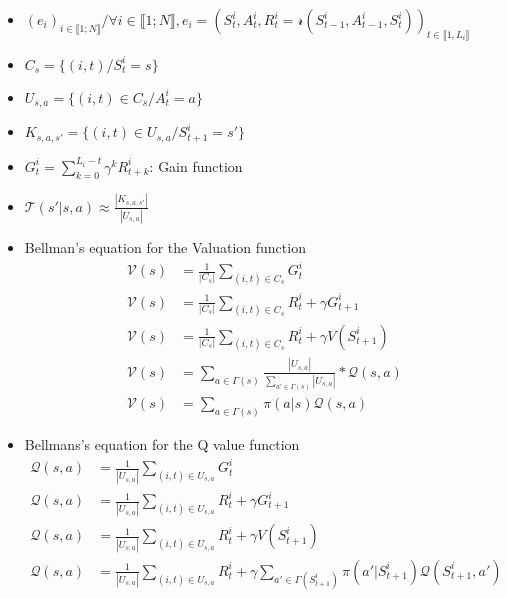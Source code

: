 \documentclass[8pt,a4paper]{extarticle}
\begin{document}
\begin{itemize}

\item
  $(e_i)_{i \in \llbracket 1; N \rrbracket} / \forall i \in \llbracket 1; N \rrbracket, e_i = (S_t^i, A^i_t, R^i_t = \mathcal r(S_{t-1}^i, A_{t-1}^i, S_t^i))_{t \in \llbracket 1, L_i \rrbracket}$

\item $C_s = \{(i, t)/ S^i_t = s\}$
\item
  $U_{s, a}= \{ (i, t) \in C_s / A_t^i = a\}$
\item
  $K_{s, a , s'}= \{(i, t) \in U_{s, a} / S_{t+1}^i = s'\}$
\item
  $G_t^i = \sum_{k=0}^{L_i - t}\gamma^k R^i_{t+k}$: Gain function
\item
  $\mathcal T(s' | s, a) \approx \frac{|K_{s, a, s'}|}{|U_{s, a}|}$

\item
  Bellman's equation for the Valuation function
  \begin{align}
    \mathcal V(s) &= \frac{1}{|C_s|}\sum_{(i, t) \in C_s}G^i_t \\
    \mathcal V(s) &= \frac{1}{|C_s|}\sum_{(i, t) \in C_s} R^i_t + \gamma G^i_{t+1}  \\
    \mathcal V(s) &= \frac{1}{|C_s|}\sum_{(i, t) \in C_s} R^i_t + \gamma V(S_{t+1}^i) \\
    \mathcal V(s) &= \sum_{a\in \Gamma(s)}\frac{|U_{s, a}|}{\sum_{a'\in \Gamma(s)}|U_{s, a}|}*\mathcal Q(s, a) \\
    \mathcal V(s) &= \sum_{a\in \Gamma(s)} \pi(a | s)\mathcal Q(s, a)
  \end{align}

\item
  Bellmans's equation for the Q value function
  \begin{align}
    \mathcal Q(s, a) &=  \frac{1}{|U_{s, a}|}\sum_{(i, t) \in U_{s, a}}G^i_t \\
    \mathcal Q(s, a) &=  \frac{1}{|U_{s, a}|}\sum_{(i, t) \in U_{s, a}}R^i_t + \gamma G^i_{t+1} \\
    \mathcal Q(s, a) &=  \frac{1}{|U_{s, a}|}\sum_{(i, t) \in U_{s, a}}R^i_t + \gamma V(S_{t+1}^i) \\
    \mathcal Q(s, a) &=  \frac{1}{|U_{s, a}|}\sum_{(i, t) \in U_{s, a}}R^i_t + \gamma \sum_{a'\in \Gamma(S_{t+1}^i)} \pi(a' | S_{t+1}^i)\mathcal Q(S_{t+1}^i, a')
  \end{align}
  
\end{itemize}
\end{document}
